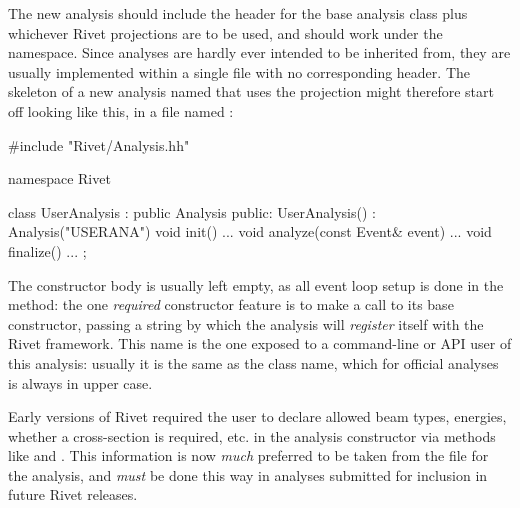 The new analysis should include the header for the base analysis class plus
whichever Rivet projections are to be used, and should work under the
 namespace. Since analyses are hardly ever intended to be inherited
from, they are usually implemented within a single  file with no
corresponding header. The skeleton of a new analysis named 
that uses the  projection might therefore start off looking
like this, in a file named :
%
\begin{snippet}
#include "Rivet/Analysis.hh"

namespace Rivet {

  class UserAnalysis : public Analysis {
  public:
    UserAnalysis() : Analysis("USERANA") { }
    void init() { ... }
    void analyze(const Event& event) { ... }
    void finalize() { ... }
  };

}
\end{snippet}

The constructor body is usually left empty, as all event loop setup is done in
the  method: the one \emph{required} constructor feature is to make
a call to its base  constructor, passing a string by which the
analysis will \emph{register} itself with the Rivet framework. This name is the
one exposed to a command-line or API user of this analysis: usually it is the
same as the class name, which for official analyses is always in upper case.

\begin{warning}
  Early versions of Rivet required the user to declare allowed beam types,
  energies, whether a cross-section is required, etc. in the analysis
  constructor via methods like  and
  . This information is now \emph{much}
  preferred to be taken from the  file for the analysis, and
  \emph{must} be done this way in analyses submitted for inclusion in future
  Rivet releases.
\end{warning}


